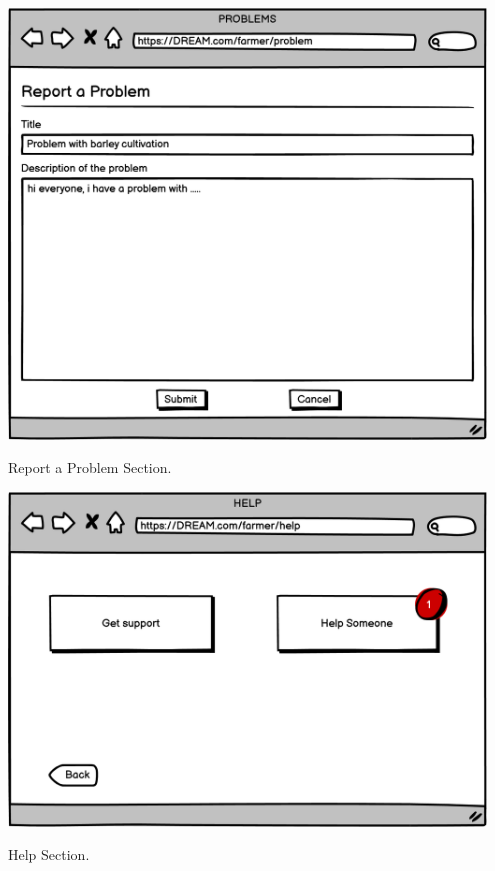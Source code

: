 \begin{minipage}{.5\textwidth}
	\centering
	\includegraphics[width=0.95\textwidth]{Images/Mockup/Farmer/03FarmerReportProblem.png}
	\captionsetup{type=figure}
	\caption{Report a Problem Section.}
\end{minipage}%
\begin{minipage}{.5\textwidth}
	\centering
	\includegraphics[width=0.95\textwidth]{Images/Mockup/Farmer/04FarmerHelpHomepage.png}
	\captionsetup{type=figure}
	\caption{Help Section.}
\end{minipage}
\vspace{0.5cm}
